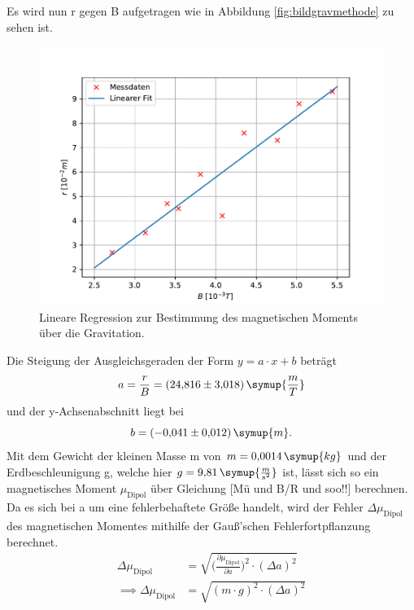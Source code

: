 Es wird nun r gegen B aufgetragen wie in Abbildung \eqref{fig:bildgravmethode} zu sehen ist.
\begin{figure}[h]
\centering
\includegraphics[scale=.9]{GravMethode.pdf}
\caption{Lineare Regression zur Bestimmung des magnetischen Moments über die Gravitation.}
\label{fig:bildgravmethode}
\end{figure}
Die Steigung der Ausgleichsgeraden der Form $y = a\cdot x + b$ beträgt 
\begin{equation*}
a = \frac {r}{B}= (24{,}816 \pm 3{,}018)\, \symup{\frac{m}{T}}
\end{equation*}
und der y-Achsenabschnitt liegt bei
\begin{equation*}
b = (-0{,}041 \pm 0{,}012)\, \symup{m}.
\end{equation*}
Mit dem Gewicht der kleinen Masse m von $m = 0{,}0014\, \symup{kg}$ und der Erdbeschleunigung g, welche hier 
$g = 9{,}81\, \symup{\frac{m}{s^2}}$ ist, lässt sich so ein magnetisches Moment $\mu_{\text{Dipol}}$ über Gleichung [Mü und B/R und soo!!] 
berechnen.
Da es sich bei a um eine fehlerbehaftete Größe handelt, wird der Fehler $\Delta{\mu_{\text{Dipol}}}$ des magnetischen Momentes mithilfe der Gauß'schen 
Fehlerfortpflanzung berechnet.
\begin{equation*}
\begin{aligned}
\Delta{\mu_{\text{Dipol}}} &= \sqrt{\biggl(\frac{\partial \mu_{\text{Dipol}}}{\partial a}\biggr)^2 \cdot (\Delta a)^2} \\
\implies \Delta{\mu_{\text{Dipol}}} &= \sqrt{(m \cdot g)^2 \cdot (\Delta a)^2} \\
\end{aligned}
\end{equation*}

